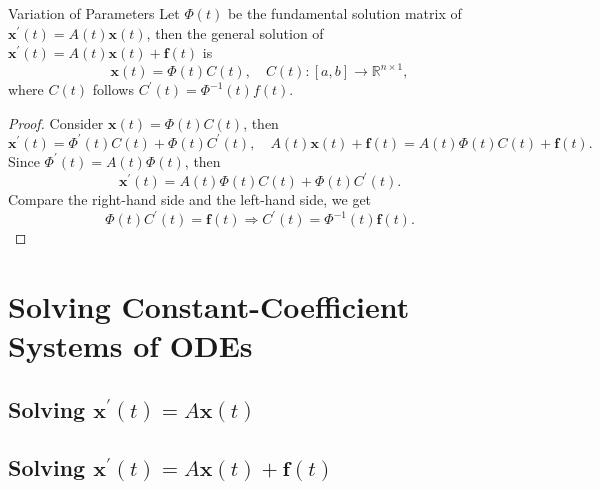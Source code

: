 \begin{proposition}{Variation of Parameters}{}
  Let $\Phi(t)$ be the fundamental solution matrix of $\mathbf{x}^{\prime}(t) = A(t)\mathbf{x}(t)$,
  then the general solution of $\mathbf{x}^{\prime}(t) = A(t) \mathbf{x}(t) + \mathbf{f}(t)$ is
  \begin{equation}
    \mathbf{x}(t) = \Phi(t)C(t), \quad C(t): [a, b] \rightarrow \mathbb{R}^{n \times 1},
  \end{equation}
  where $C(t)$ follows $C^{\prime}(t) = \Phi^{-1}(t)f(t)$.
\end{proposition}

\begin{proof}
  Consider $\mathbf{x}(t) = \Phi(t)C(t)$, then
  \begin{equation}
    \mathbf{x}^{\prime}(t) = \Phi^{\prime}(t) C(t) + \Phi(t)C^{\prime}(t), \quad
    A(t)\mathbf{x}(t) + \mathbf{f}(t) = A(t) \Phi(t) C(t) + \mathbf{f}(t).
  \end{equation}
  Since $\Phi^{\prime}(t) = A(t)\Phi(t)$, then
  \begin{equation}
    \mathbf{x}^{\prime}(t) = A(t) \Phi(t)C(t) + \Phi(t)C^{\prime}(t).
  \end{equation}
  Compare the right-hand side and the left-hand side, we get
  \begin{equation}
    \Phi(t)C^{\prime}(t) = \mathbf{f}(t) \Rightarrow C^{\prime}(t) = \Phi^{-1}(t) \mathbf{f}(t).
  \end{equation}
\end{proof}

\section{Solving Constant-Coefficient Systems of ODEs}

\subsection{Solving $\mathbf{x}^{\prime}(t) = A \mathbf{x}(t)$}

\subsection{Solving $\mathbf{x}^{\prime}(t) = A \mathbf{x}(t) + \mathbf{f}(t)$}





